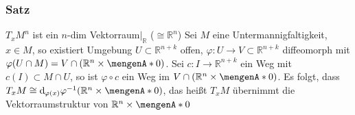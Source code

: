 \subsubsection[Satz: Vektorraumstruktur des Tangentialraumes]{Satz}
\label{ssub:126}
$T_x M^n$ ist ein $n$-dim Vektorraum$\vert_{\mathds{R}}$ ($\cong \mathds{R}^n$)
Sei $M$ eine Untermannigfaltigkeit, $x\in M$, so existiert Umgebung $U\subset \mathds{R}^{n+k}$ offen, $\varphi:U\to V\subset \mathds{R}^{n+k}$ diffeomorph mit $\varphi(U\cap M) = V\cap(\mathds{R}^n\times \set{0})$. Sei $c: I\to \mathds{R}^{n+k}$ ein Weg mit $c(I)\subset M\cap U$, so ist $\varphi \circ c$ ein Weg im $V\cap(\mathds{R}^n\times \set{0})$. Es folgt, dass $T_x M \cong \mathd_{\varphi(x)} \varphi^{-1}(\mathds{R}^n\times \set{0})$, das heißt $T_x M$ übernimmt die Vektorraumstruktur von $\mathds{R}^n \times \set{0}$ 

